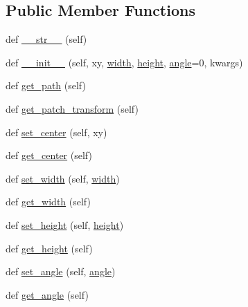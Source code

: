 \subsection*{Public Member Functions}
\begin{DoxyCompactItemize}
\item 
def \hyperlink{classmatplotlib_1_1patches_1_1Ellipse_a17aec80c0dbad8761ea0dace99769fff}{\+\_\+\+\_\+str\+\_\+\+\_\+} (self)
\item 
def \hyperlink{classmatplotlib_1_1patches_1_1Ellipse_a9f85b749219fb8d351202891fdf71b24}{\+\_\+\+\_\+init\+\_\+\+\_\+} (self, xy, \hyperlink{classmatplotlib_1_1patches_1_1Ellipse_a60c9f834917ca71a1ca9f92d6e5b7986}{width}, \hyperlink{classmatplotlib_1_1patches_1_1Ellipse_a0f3d6d29727e93758c785abd6b14abea}{height}, \hyperlink{classmatplotlib_1_1patches_1_1Ellipse_a36ada1e22adc07aa2c4a753a272f8f62}{angle}=0, kwargs)
\item 
def \hyperlink{classmatplotlib_1_1patches_1_1Ellipse_ad9796e4449f123dd033038d2ebf56748}{get\+\_\+path} (self)
\item 
def \hyperlink{classmatplotlib_1_1patches_1_1Ellipse_a77ee0dc379bf010fd9ce5f17575ed126}{get\+\_\+patch\+\_\+transform} (self)
\item 
def \hyperlink{classmatplotlib_1_1patches_1_1Ellipse_a7a9e42cd894c8f85917e940ea84fc1e3}{set\+\_\+center} (self, xy)
\item 
def \hyperlink{classmatplotlib_1_1patches_1_1Ellipse_a0bced80a110919f884e374422801d013}{get\+\_\+center} (self)
\item 
def \hyperlink{classmatplotlib_1_1patches_1_1Ellipse_a550e52dde5db8ebd22b17735c96ae4cf}{set\+\_\+width} (self, \hyperlink{classmatplotlib_1_1patches_1_1Ellipse_a60c9f834917ca71a1ca9f92d6e5b7986}{width})
\item 
def \hyperlink{classmatplotlib_1_1patches_1_1Ellipse_a6ce07595904968e01631afe4f8fa467b}{get\+\_\+width} (self)
\item 
def \hyperlink{classmatplotlib_1_1patches_1_1Ellipse_a1e9e57643cbc37eb5482b0872b743604}{set\+\_\+height} (self, \hyperlink{classmatplotlib_1_1patches_1_1Ellipse_a0f3d6d29727e93758c785abd6b14abea}{height})
\item 
def \hyperlink{classmatplotlib_1_1patches_1_1Ellipse_ac8e48dc5addbe0eeca0ee76f6d567397}{get\+\_\+height} (self)
\item 
def \hyperlink{classmatplotlib_1_1patches_1_1Ellipse_a2562682ddf50cd3923c9ebf221cb46e4}{set\+\_\+angle} (self, \hyperlink{classmatplotlib_1_1patches_1_1Ellipse_a36ada1e22adc07aa2c4a753a272f8f62}{angle})
\item 
def \hyperlink{classmatplotlib_1_1patches_1_1Ellipse_ab1ccd52d00ba28b6443813c49722e726}{get\+\_\+angle} (self)
\end{DoxyCompactItemize}
